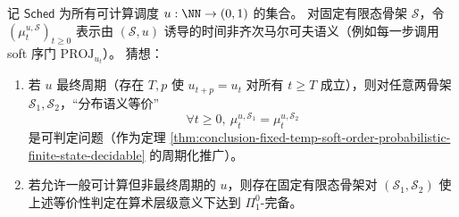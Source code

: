 \begin{conjecture}\label{conj:conclusion-eventually-periodic-schedule-frontier}
记 \(\mathsf{Sched}\) 为所有可计算调度 \(u:\NN\to(0,1)\) 的集合。
对固定有限态骨架 \(\mathcal S\)，令 \((\mu_t^{u,\mathcal S})_{t\ge 0}\) 表示由 \((\mathcal S,u)\) 诱导的时间非齐次马尔可夫语义（例如每一步调用 soft 序门 \(\mathrm{PROJ}_{u_t}\)）。
猜想：
\begin{enumerate}
\normalfont
  \item 若 \(u\) 最终周期（存在 \(T,p\) 使 \(u_{t+p}=u_t\) 对所有 \(t\ge T\) 成立），则对任意两骨架 \(\mathcal S_1,\mathcal S_2\)，“分布语义等价”
  \[
  \forall t\ge 0,\ \mu_t^{u,\mathcal S_1}=\mu_t^{u,\mathcal S_2}
  \]
  是可判定问题（作为定理 \ref{thm:conclusion-fixed-temp-soft-order-probabilistic-finite-state-decidable} 的周期化推广）。
  \item 若允许一般可计算但非最终周期的 \(u\)，则存在固定有限态骨架对 \((\mathcal S_1,\mathcal S_2)\) 使上述等价性判定在算术层级意义下达到 \(\Pi^0_1\)-完备。
\end{enumerate}
\end{conjecture}

\endinput

